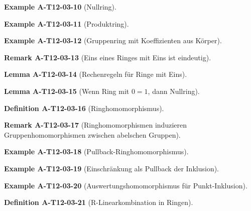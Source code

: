 \documentclass[10pt, letterpaper]{article}
\newcommand{\CustomHeading}[3]{%
  \par\medskip\noindent%
  \textbf{#1 #2} \textnormal{(#3)}.\enskip%
}
\newenvironment{DEF}[2]{\CustomHeading{Definition}{#1}{#2}}{}
\newenvironment{LEM}[2]{\CustomHeading{Lemma}{#1}{#2}}{}
\newenvironment{REM}[2]{\CustomHeading{Remark}{#1}{#2}}{}
\newenvironment{EXA}[2]{\CustomHeading{Example}{#1}{#2}}{}
\begin{document}
\begin{EXA}{A-T12-03-10}{Nullring}
\end{EXA}

\begin{EXA}{A-T12-03-11}{Produktring}
\end{EXA}

\begin{EXA}{A-T12-03-12}{Gruppenring mit Koeffizienten aus Körper}
\end{EXA}

\begin{REM}{A-T12-03-13}{Eins eines Ringes mit Eins ist eindeutig}
\end{REM}

\begin{LEM}{A-T12-03-14}{Rechenregeln für Ringe mit Eins}
\end{LEM}

\begin{LEM}{A-T12-03-15}{Wenn Ring mit $0=1$, dann Nullring}
\end{LEM}

\begin{DEF}{A-T12-03-16}{Ringhomomorphismus}
\end{DEF}

\begin{REM}{A-T12-03-17}{Ringhomomorphismen induzieren Gruppenhomomorphismen zwischen abelschen Gruppen}
\end{REM}

\begin{EXA}{A-T12-03-18}{Pullback-Ringhomomorphismus}
\end{EXA}

\begin{EXA}{A-T12-03-19}{Einschränkung als Pullback der Inklusion}
\end{EXA}

\begin{EXA}{A-T12-03-20}{Auswertungshomomorphismus für Punkt-Inklusion}
\end{EXA}

\begin{DEF}{A-T12-03-21}{R-Linearkombination in Ringen}
\end{DEF}
\end{document}
